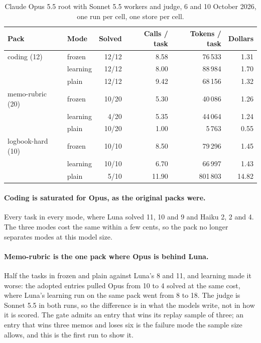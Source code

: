 \documentclass[11pt,a4paper]{article}
\begin{document}
\begin{table}[htbp]
\centering
\small
\begin{tabular}{@{}llrrrr@{}}
\toprule
Pack & Mode & Solved & Calls / task & Tokens / task & Dollars \\
\midrule
coding (12)      & frozen   & 12/12 & 8.58 & 76\,533 & 1.31 \\
                 & learning & 12/12 & 8.00 & 88\,984 & 1.70 \\
                 & plain    & 12/12 & 9.42 & 68\,156 & 1.32 \\
\addlinespace
memo-rubric (20) & frozen   & 10/20 & 5.30 & 40\,086 & 1.26 \\
                 & learning & 4/20  & 5.35 & 44\,064 & 1.24 \\
                 & plain    & 10/20 & 1.00 & 5\,763  & 0.55 \\
\addlinespace
logbook-hard (10) & frozen   & 10/10 & 8.50  & 79\,296  & 1.45 \\
                  & learning & 10/10 & 6.70  & 66\,997  & 1.43 \\
                  & plain    & 5/10  & 11.90 & 801\,803 & 14.82 \\
\bottomrule
\end{tabular}
\caption{Claude Opus 5.5 root with Sonnet 5.5 workers and judge, 6 and 10
October 2026, one run per cell, one store per cell.}
\label{tab:opus2}
\end{table}

\paragraph{Coding is saturated for Opus, as the original packs were.} Every
task in every mode, where Luna solved 11, 10 and 9 and Haiku 2, 2 and 4. The
three modes cost the same within a few cents, so the pack no longer separates
modes at this model size.

\paragraph{Memo-rubric is the one pack where Opus is behind Luna.} Half the
tasks in frozen and plain against Luna's 8 and 11, and learning made it
worse: the adopted entries pulled Opus from 10 to 4 solved at the same cost,
where Luna's learning run on the same pack went from 8 to 18. The judge is
Sonnet 5.5 in both runs, so the difference is in what the models write, not
in how it is scored. The gate admits an entry that wins its replay sample of
three; an entry that wins three memos and loses six is the failure mode the
sample size allows, and this is the first run to show it.
\end{document}
